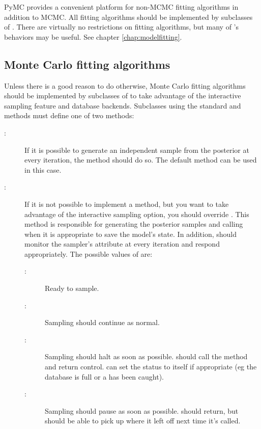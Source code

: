 PyMC provides a convenient platform for non-MCMC fitting algorithms in addition to MCMC. All fitting algorithms should be implemented by subclasses of . There are virtually no restrictions on fitting algorithms, but many of 's behaviors may be useful. See chapter \ref{chap:modelfitting}.

\hypertarget{custom-MC}{}
\subsection{Monte Carlo fitting algorithms} \label{custom-MC}

Unless there is a good reason to do otherwise, Monte Carlo fitting algorithms should be implemented by subclasses of  to take advantage of the interactive sampling feature and database backends. Subclasses using the standard  and  methods must define one of two methods:
\begin{description}
   \item[:] If it is possible to generate an independent sample from the posterior at every iteration, the  method should do so. The default  method can be used in this case.
   \item[:] If it is not possible to implement a  method, but you want to take advantage of the interactive sampling option, you should override . This method is responsible for generating the posterior samples and calling  when it is appropriate to save the model's state. In addition,  should monitor the sampler's  attribute at every iteration and respond appropriately. The possible values of  are:
   \begin{description}
      \item[:] Ready to sample.
      \item[:] Sampling should continue as normal.
      \item[:] Sampling should halt as soon as possible.  should call the  method and return control.  can set the status to  itself if appropriate (eg the database is full or a  has been caught).
      \item[:] Sampling should pause as soon as possible.  should return, but should be able to pick up where it left off next time it's called.
   \end{description}
\end{description}

